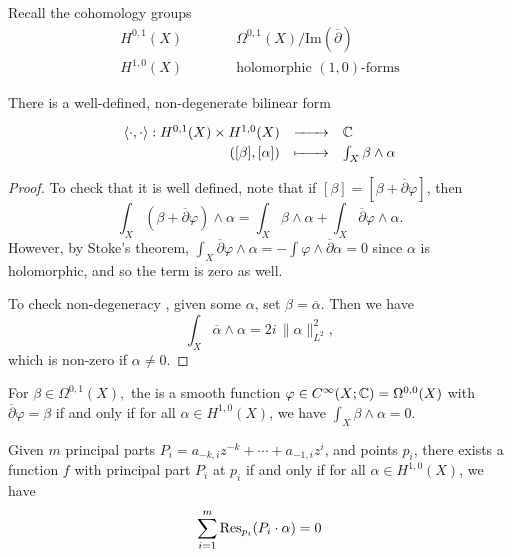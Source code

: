 \documentclass{lkx_paper}
\begin{document}
Recall the cohomology groups
\[
	\begin{aligned}
		H^{0,1}(X) \quad\quad\quad & \Omega^{0,1}(X)/\textrm{Im}(\overline{\partial}) \\
		H^{1,0}(X) \quad\quad\quad & \textrm{holomorphic }(1,0)\textrm{-forms}
	\end{aligned}
\]
\begin{lemma}
	There is a well-defined, non-degenerate bilinear form
	\[
		\definefunction{\langle\cdot,\cdot \rangle}{H^{0,1}(X)\times H^{1,0}(X)}{\C}{([\beta], [\alpha])}{\int_X \beta\wedge \alpha}
	\]
\end{lemma}

\begin{proof}
	To check that it is well defined, note that if $[\beta]=[\beta + \overline{\partial}\varphi]$, then
	\[
		\int_X(\beta +\overline{\partial}\varphi)\wedge \alpha = \int_X \beta\wedge \alpha + \int_X \overline{\partial}\varphi \wedge \alpha.
	\]
	However, by Stoke's theorem, $\int_X \overline{\partial}\varphi \wedge \alpha = -\int \varphi \wedge \overline{\partial}\alpha=0$ since $\alpha$ is holomorphic, and so the term is zero as well.

	To check non-degeneracy , given some $\alpha$, set $\beta = \overline{\alpha}$. Then we have
	\[
		\int_X \overline{\alpha}\wedge \alpha = 2i\,\|\alpha\|^2_{L^2},
	\]
	which is non-zero if $\alpha\neq 0$.
\end{proof}

\begin{corollary}
	For $\beta\in \Omega^{0,1}(X),$ the is a smooth function $\varphi\in C^\infty(X; \mathbb{C})=\Omega^{0,0}(X)$ with $\overline{\partial}\varphi = \beta$ if and only if for all $\alpha\in H^{1,0}(X)$, we have $\int_X \beta\wedge \alpha = 0$.
\end{corollary}

\begin{theorem}
	Given $m$ principal parts $P_i=a_{-k,i}z^{-k}+\cdots + a_{-1,i} z^i$, and points $p_i$, there exists a function $f$ with principal part $P_i$ at $p_i$ if and only if for all $\alpha\in H^{1,0}(X)$, we have
	\[
		\sum^m_{i=1} \mathrm{Res}_{p_i}(P_i\cdot \alpha)=0
	\]
\end{theorem}
\end{document}
